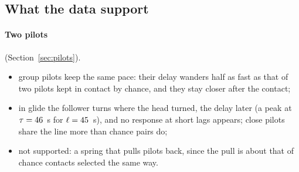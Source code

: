 \subsection{What the data support}\label{sec:conclusions}

\paragraph{Two pilots} (Section~\ref{sec:pilots}).
\begin{itemize}
  \item group pilots keep the same pace: their delay wanders half as fast as that of two pilots
        kept in contact by chance, and they stay closer after the contact;
  \item in glide the follower turns where the head turned, the delay later (a peak at
        $\tau=46$~s for $\ell=45$~s), and no response at short lags appears;
        close pilots share the line more than chance pairs do;
  \item not supported: a spring that pulls pilots back, since the pull is about that of chance
        contacts selected the same way.
\end{itemize}

